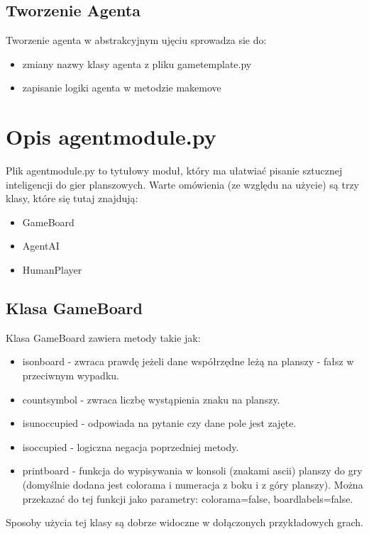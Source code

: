 \documentclass[polish,shortabstract,inz]{iithesis}
\begin{document}
\subsection{Tworzenie Agenta}
Tworzenie agenta w abstrakcyjnym ujęciu sprowadza sie do:
\begin{itemize}
  \item zmiany nazwy klasy agenta z pliku game\textunderscore template.py
  \item zapisanie logiki agenta w metodzie make\textunderscore move
\end{itemize}

\section{Opis agent\textunderscore module.py}
Plik agent\textunderscore module.py to tytułowy moduł, który ma ułatwiać pisanie sztucznej inteligencji do gier planszowych.
Warte omówienia (ze względu na użycie) są trzy klasy, które się tutaj znajdują:
\begin{itemize}
  \item GameBoard
  \item AgentAI
  \item HumanPlayer
\end{itemize}

\subsection{Klasa GameBoard}
Klasa GameBoard zawiera metody takie jak:
\begin{itemize}
  \item is\textunderscore on\textunderscore board - zwraca prawdę jeżeli dane współrzędne leżą na planszy - fałsz w przeciwnym wypadku.
  \item count\textunderscore symbol - zwraca liczbę wystąpienia znaku na planszy.
  \item is\textunderscore unoccupied - odpowiada na pytanie czy dane pole jest zajęte.
  \item is\textunderscore occupied - logiczna negacja poprzedniej metody.
  \item print\textunderscore board - funkcja do wypisywania w konsoli (znakami ascii) planszy do gry (domyślnie dodana jest colorama i numeracja z boku i z góry planszy). Można przekazać do tej funkcji jako parametry: colorama=false, board\textunderscore labels=false.
\end{itemize}
Sposoby użycia tej klasy są dobrze widoczne w dołączonych przykładowych grach.
\end{document}
